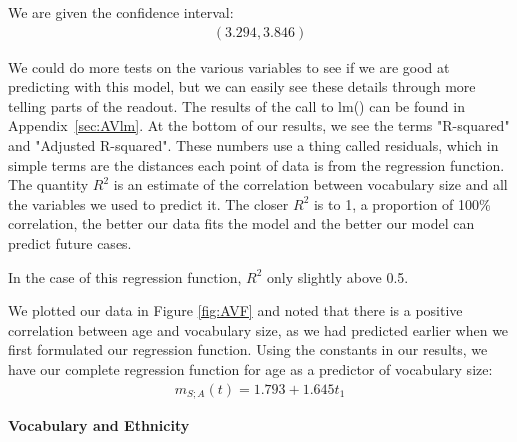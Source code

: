 \documentclass[11pt]{article}  %
\begin{document}
\indent We are given the confidence interval:
    \begin{align*}
        (3.294, 3.846)
    \end{align*}
\indent %


\indent We could do more tests on the various variables to see if we are good at predicting with this model, but we can easily see these details through more telling parts of the readout. The results of the call to lm() can be found in Appendix~\ref{sec:AVlm}. At the bottom of our results, we see the terms "R-squared" and "Adjusted R-squared". These numbers use a thing called residuals, which in simple terms are the distances each point of data is from the regression function. The quantity $R^2$ is an estimate of the correlation between vocabulary size and all the variables we used to predict it. The closer $R^2$ is to 1, a proportion of 100\% correlation, the better our data fits the model and the better our model can predict future cases.

\indent In the case of this regression function, $R^2$ only slightly above 0.5.

\indent We plotted our data in Figure \ref{fig:AVF} and noted that there is a positive correlation between age and vocabulary size, as we had predicted earlier when we first formulated our regression function. Using the constants in our results, we have our complete regression function for age as a predictor of vocabulary size:
    \begin{align*}
        m_{S;A}(t) = 1.793 + 1.645 t_1
    \end{align*}


\textbf{Vocabulary and Ethnicity}
\end{document}
